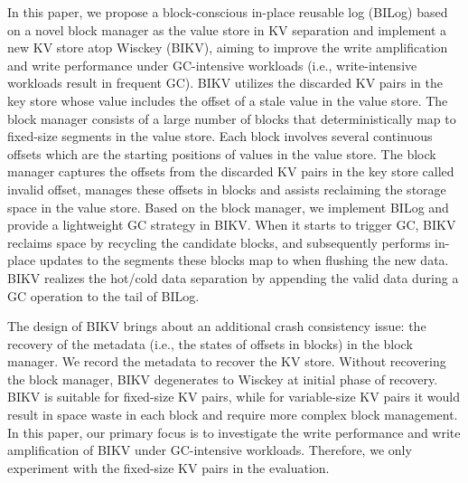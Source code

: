 \documentclass[sigconf]{acmart}
\begin{document}
In this paper, we propose a block-conscious in-place reusable log (BILog) based on a novel block manager as the value store in KV separation and implement a new KV store atop Wisckey (BIKV), aiming to improve the write amplification and write performance under GC-intensive workloads (i.e., write-intensive workloads result in frequent GC). BIKV utilizes the discarded KV pairs in the key store whose value includes the offset of a stale value in the value store. The block manager consists of a large number of blocks that deterministically map to fixed-size segments in the value store. Each block involves several continuous offsets which are the starting positions of values in the value store. The block manager captures the offsets from the discarded KV pairs in the key store called invalid offset, manages these offsets in blocks and assists reclaiming the storage space in the value store. Based on the block manager, we implement BILog and provide a lightweight GC strategy in BIKV. When it starts to trigger GC, BIKV reclaims space by recycling the candidate blocks, and subsequently performs in-place updates to the segments these blocks map to when flushing the new data. BIKV realizes the hot/cold data separation by appending the valid data during a GC operation to the tail of BILog.

The design of BIKV brings about an additional crash consistency issue: the recovery of the metadata (i.e., the states of offsets in blocks) in the block manager. We record the metadata to recover the KV store. Without recovering the block manager, BIKV degenerates to Wisckey at initial phase of recovery. BIKV is suitable for fixed-size KV pairs, while for variable-size KV pairs it would result in space waste in each block and require more complex block management. In this paper, our primary focus is to investigate the write performance and write amplification of BIKV under GC-intensive workloads. Therefore, we only experiment with the fixed-size KV pairs in the evaluation.
\end{document}
